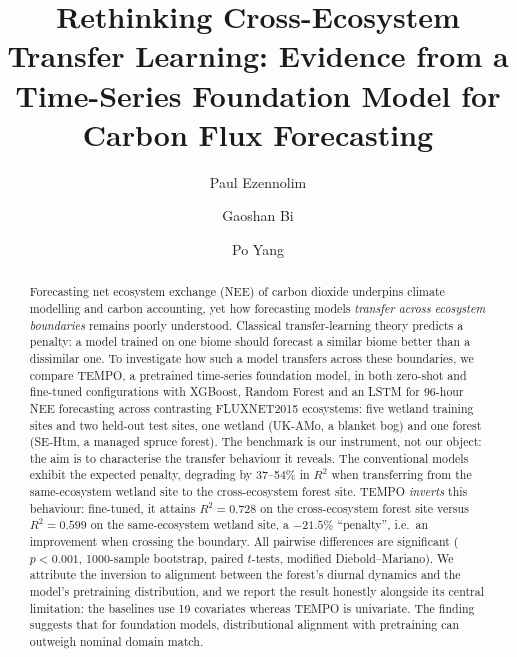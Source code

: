 \documentclass[sigconf]{acmart}          %
\begin{document}
\title{Rethinking Cross-Ecosystem Transfer Learning: Evidence from a
Time-Series Foundation Model for Carbon Flux Forecasting}

\author{Paul Ezennolim}

\author{Gaoshan Bi}

\author{Po Yang}

\renewcommand{\shortauthors}{Ezennolim et al.}

\begin{abstract}
Forecasting net ecosystem exchange (NEE) of carbon dioxide underpins
climate modelling and carbon accounting, yet how forecasting models
\emph{transfer across ecosystem boundaries} remains poorly understood.
Classical transfer-learning theory predicts a penalty: a model trained on
one biome should forecast a similar biome better than a dissimilar one.
To investigate how such a model transfers across these boundaries, we compare
TEMPO, a pretrained time-series foundation model, in both zero-shot and
fine-tuned configurations with XGBoost, Random Forest and an LSTM for 96-hour
NEE forecasting across contrasting FLUXNET2015 ecosystems: five wetland
training sites and two held-out test sites, one wetland (UK-AMo, a blanket
bog) and one forest (SE-Htm, a managed spruce forest). The benchmark is our instrument, not our object:
the aim is to characterise the transfer behaviour it reveals. The conventional
models exhibit the expected penalty, degrading by 37--54\% in $R^2$ when
transferring from
the same-ecosystem wetland site to the cross-ecosystem forest site.
TEMPO \emph{inverts} this behaviour: fine-tuned, it attains $R^2=0.728$ on
the cross-ecosystem forest site versus $R^2=0.599$ on the same-ecosystem
wetland site, a $-21.5\%$ ``penalty'', i.e.\ an improvement when crossing
the boundary. All pairwise differences are significant ($p<0.001$, 1000-sample
bootstrap, paired $t$-tests, modified Diebold--Mariano). We attribute the inversion to
alignment between the forest's diurnal dynamics and the
model's pretraining distribution, and we report the result honestly alongside
its central limitation: the baselines use 19 covariates whereas TEMPO is
univariate. The finding suggests that for foundation models, distributional
alignment with pretraining can outweigh nominal domain match.
\end{abstract}
\end{document}
